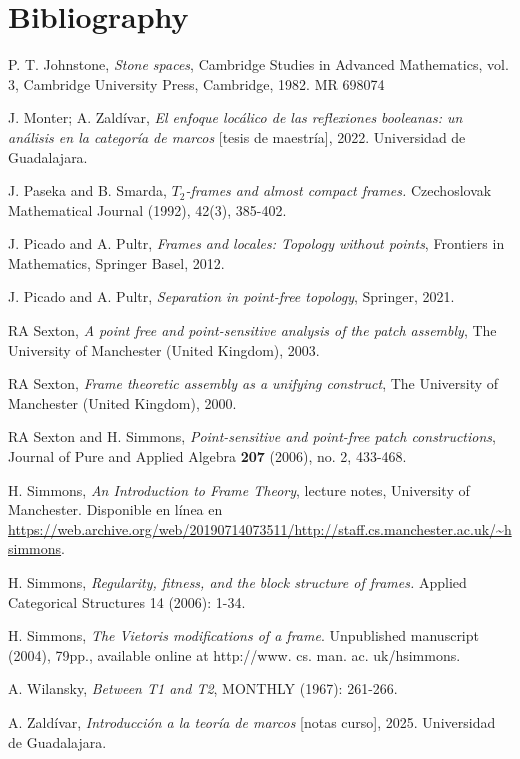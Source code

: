 \chapter*{Bibliography}

\begin{thebibliography}{20}

 P. T. Johnstone, \textit{Stone spaces}, Cambridge Studies in Advanced Mathematics, vol. 3, Cambridge University Press, Cambridge, 1982. MR 698074

 J. Monter; A. Zaldívar, \textit{El enfoque locálico de las reflexiones booleanas: un análisis en la categoría de marcos} [tesis de maestría], 2022. Universidad de Guadalajara.

 J. Paseka and B. Smarda, \textit{$ T_2 $-frames and almost compact frames.} Czechoslovak Mathematical Journal (1992), 42(3), 385-402.

 J. Picado and A. Pultr, \textit{Frames and locales: Topology without points}, Frontiers in Mathematics, Springer Basel, 2012.

 J. Picado and A. Pultr, \textit{Separation in point-free topology}, Springer, 2021.

 RA Sexton, \textit{A point free and point-sensitive analysis of the patch assembly}, The University of Manchester (United Kingdom), 2003.

 RA Sexton, \textit{Frame theoretic assembly as a unifying construct}, The University of Manchester (United Kingdom), 2000.

 RA Sexton and H. Simmons, \textit{Point-sensitive and point-free patch constructions}, Journal of Pure and Applied Algebra \textbf{207} (2006), no. 2, 433-468.

 H. Simmons, \textit{An Introduction to Frame Theory}, lecture notes, University of Manchester. Disponible en línea en \url{https://web.archive.org/web/20190714073511/http://staff.cs.manchester.ac.uk/~hsimmons}.

 H. Simmons, \textit{Regularity, fitness, and the block structure of frames.} Applied Categorical Structures 14 (2006): 1-34.

 H. Simmons, \textit{The Vietoris modifications of a frame}. Unpublished manuscript (2004), 79pp., available online at http://www. cs. man. ac. uk/hsimmons.

 A. Wilansky, \textit{Between T1 and T2}, MONTHLY (1967): 261-266.

 A. Zaldívar, \textit{Introducción a la teoría de marcos} [notas curso], 2025. Universidad de Guadalajara.

\end{thebibliography}